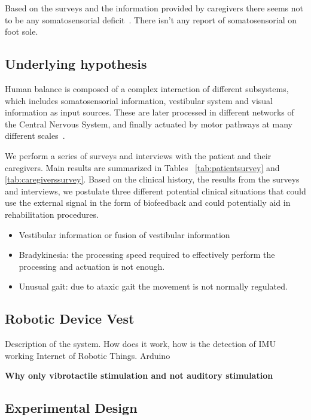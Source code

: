 \documentclass[conference]{IEEEtran}
\begin{document}
Based on the surveys and the information provided by caregivers there seems not to be any somatosensorial deficit~\cite{Donato.etal2016}. 
There isn't any report of somatosensorial on foot sole. 


\subsection{Underlying hypothesis}

Human balance is composed of a complex interaction of different subsystems, which includes somatosensorial information, vestibular system and visual information as input sources.  These are later processed in different networks of the Central Nervous System, and finally actuated by motor pathways at many different scales~\cite{Donato.etal2016}.

We perform a series of surveys and interviews with the patient and their caregivers.  Main results are summarized in 
Tables ~\ref{tab:patientsurvey} and \ref{tab:caregiverssurvey}.  Based on the clinical history, the results from the surveys and interviews, we postulate three different potential clinical situations that could use the external signal in the form of biofeedback and could potentially aid in rehabilitation procedures.


\begin{itemize}
\item Vestibular information or fusion of vestibular information
\item Bradykinesia: the processing speed required to effectively perform the processing and actuation is not enough.
\item Unusual gait: due to ataxic gait the movement is not normally regulated.
\end{itemize}


\subsection{Robotic Device Vest}
Description of the system.
How does it work, how is the detection of IMU working
Internet of Robotic Things.
Arduino

\textbf{Why only vibrotactile stimulation and not auditory stimulation}

\subsection{Experimental Design}
\end{document}
